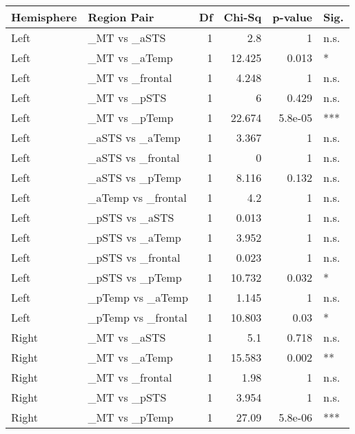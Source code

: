 \begin{table}[h]
\centering
\begin{tabular}{llrrrl}
\toprule
 Hemisphere   & Region Pair        &   Df &   Chi-Sq &   p-value & Sig.   \\
\midrule
 Left         & \_MT vs \_aSTS       &    1 &    2.8   &   1       & n.s.   \\
 Left         & \_MT vs \_aTemp      &    1 &   12.425 &   0.013   & *      \\
 Left         & \_MT vs \_frontal    &    1 &    4.248 &   1       & n.s.   \\
 Left         & \_MT vs \_pSTS       &    1 &    6     &   0.429   & n.s.   \\
 Left         & \_MT vs \_pTemp      &    1 &   22.674 &   5.8e-05 & ***    \\
 Left         & \_aSTS vs \_aTemp    &    1 &    3.367 &   1       & n.s.   \\
 Left         & \_aSTS vs \_frontal  &    1 &    0     &   1       & n.s.   \\
 Left         & \_aSTS vs \_pTemp    &    1 &    8.116 &   0.132   & n.s.   \\
 Left         & \_aTemp vs \_frontal &    1 &    4.2   &   1       & n.s.   \\
 Left         & \_pSTS vs \_aSTS     &    1 &    0.013 &   1       & n.s.   \\
 Left         & \_pSTS vs \_aTemp    &    1 &    3.952 &   1       & n.s.   \\
 Left         & \_pSTS vs \_frontal  &    1 &    0.023 &   1       & n.s.   \\
 Left         & \_pSTS vs \_pTemp    &    1 &   10.732 &   0.032   & *      \\
 Left         & \_pTemp vs \_aTemp   &    1 &    1.145 &   1       & n.s.   \\
 Left         & \_pTemp vs \_frontal &    1 &   10.803 &   0.03    & *      \\
 Right        & \_MT vs \_aSTS       &    1 &    5.1   &   0.718   & n.s.   \\
 Right        & \_MT vs \_aTemp      &    1 &   15.583 &   0.002   & **     \\
 Right        & \_MT vs \_frontal    &    1 &    1.98  &   1       & n.s.   \\
 Right        & \_MT vs \_pSTS       &    1 &    3.954 &   1       & n.s.   \\
 Right        & \_MT vs \_pTemp      &    1 &   27.09  &   5.8e-06 & ***    \\

\end{tabular}
\end{table}
